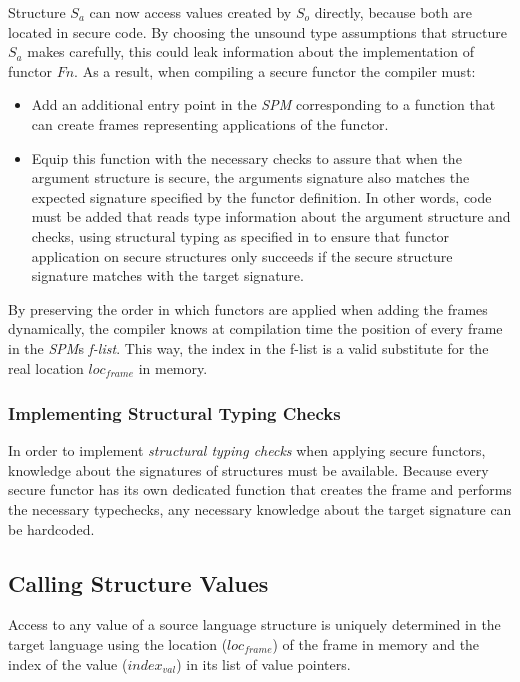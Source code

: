 \documentclass[10pt,a4paper,master=cws, masteroption=ai,english,inputenc=utf8]{kulemt}
\begin{document}
\begin{description}
Structure $S_{a}$ can now access values created by $S_{o}$ directly, because both are located in secure code.
By choosing the unsound type assumptions that structure $S_{a}$ makes carefully, this could leak information about the implementation of functor $Fn$.
As a result, when compiling a secure functor the compiler must:
\begin{itemize}
\item Add an additional entry point in the \emph{SPM} corresponding to a function that can create frames representing applications of the functor.
\item Equip this function with the necessary checks to assure that when the argument structure is secure, the arguments signature also matches the expected signature specified by the functor definition.
In other words, code must be added that reads type information about the argument structure and checks, using structural typing as specified in  to ensure that functor application on secure structures only succeeds if the secure structure signature matches with the target signature.
\end{itemize}

By preserving the order in which functors are applied when adding the frames dynamically, the compiler knows at compilation time the position of every frame in the \emph{SPM}s \emph{f-list}.
This way, the index in the f-list is a valid substitute for the real location $\mathit{loc}_{\mathit{frame}}$ in memory.
\end{description}

\subsubsection{Implementing Structural Typing Checks}
In order to implement \emph{structural typing checks} when applying secure functors, knowledge about the signatures of structures must be available.
Because every secure functor has its own dedicated function that creates the frame and performs the necessary typechecks, any necessary knowledge about the target signature can be hardcoded.


\subsection{Calling Structure Values}
Access to any value of a source language structure is uniquely determined in the target language using the location ($loc_{frame}$) of the frame in memory and the index of the value ($index_{val}$) in its list of value pointers.
\end{document}
